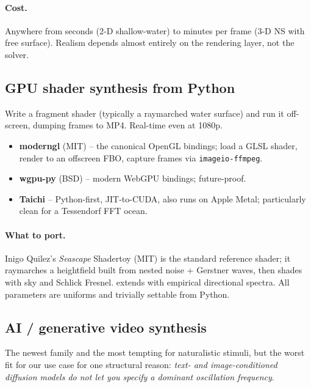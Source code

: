 \documentclass[11pt,a4paper]{article}
\newcommand{\code}[1]{\texttt{\small #1}}
\begin{document}
\paragraph{Cost.} Anywhere from seconds (2-D shallow-water) to minutes
per frame (3-D NS with free surface). Realism depends almost entirely on
the rendering layer, not the solver.

\subsection{GPU shader synthesis from Python}

Write a fragment shader (typically a raymarched water surface) and run it
off-screen, dumping frames to MP4. Real-time even at 1080p.

\begin{itemize}[leftmargin=1.5em,itemsep=0.3em]
  \item \textbf{moderngl} (MIT) -- the canonical OpenGL bindings; load a
        GLSL shader, render to an offscreen FBO, capture frames via
        \code{imageio-ffmpeg}.
  \item \textbf{wgpu-py} (BSD) -- modern WebGPU bindings; future-proof.
  \item \textbf{Taichi} -- Python-first, JIT-to-CUDA, also runs on Apple
        Metal; particularly clean for a Tessendorf FFT ocean.
\end{itemize}

\paragraph{What to port.} Inigo Quilez's \emph{Seascape} Shadertoy (MIT)
is the standard reference shader; it raymarches a heightfield built from
nested noise + Gerstner waves, then shades with sky and Schlick Fresnel.
\citet{horvath2015} extends with empirical directional spectra. All
parameters are uniforms and trivially settable from Python.

\subsection{AI / generative video synthesis}\label{sec:ai}

The newest family and the most tempting for naturalistic stimuli, but the
worst fit for our use case for one structural reason: \emph{text- and
image-conditioned diffusion models do not let you specify a dominant
oscillation frequency}.
\end{document}
